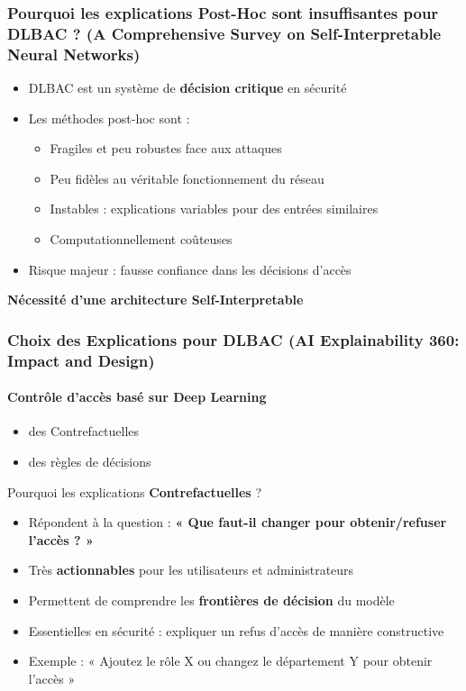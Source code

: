 \documentclass{beamer}
\begin{document}
\begin{frame}
\frametitle{Pourquoi les explications Post-Hoc sont insuffisantes pour DLBAC ? (A Comprehensive Survey on Self-Interpretable
Neural Networks)}

\begin{itemize}
    \item DLBAC est un système de \textbf{décision critique} en sécurité
    \item Les méthodes post-hoc sont :
    \begin{itemize}
        \item \alert{Fragiles} et peu robustes face aux attaques
        \item \alert{Peu fidèles} au véritable fonctionnement du réseau
        \item \alert{Instables} : explications variables pour des entrées similaires
        \item Computationnellement coûteuses
    \end{itemize}
    \item Risque majeur : fausse confiance dans les décisions d’accès
\end{itemize}

\begin{center}
\textbf{\Large Nécessité d’une architecture Self-Interpretable}
\end{center}

\end{frame}

\begin{frame}
\frametitle{Choix des Explications pour DLBAC (AI Explainability 360: Impact and Design)}
\framesubtitle{Contrôle d'accès basé sur Deep Learning}
\begin{itemize}Quel type d'explication choisir ?
    \item des Contrefactuelles
    \item des règles de décisions
\end{itemize}

\begin{block}{Pourquoi les explications \textbf{Contrefactuelles} ?}
\begin{itemize}
    \item Répondent à la question : \textbf{« Que faut-il changer pour obtenir/refuser l'accès ? »}
    \item Très \textbf{actionnables} pour les utilisateurs et administrateurs
    \item Permettent de comprendre les \textbf{frontières de décision} du modèle
    \item Essentielles en sécurité : expliquer un refus d'accès de manière constructive
    \item Exemple : « Ajoutez le rôle X ou changez le département Y pour obtenir l'accès »
\end{itemize}
\end{block}
\end{frame}
\end{document}
